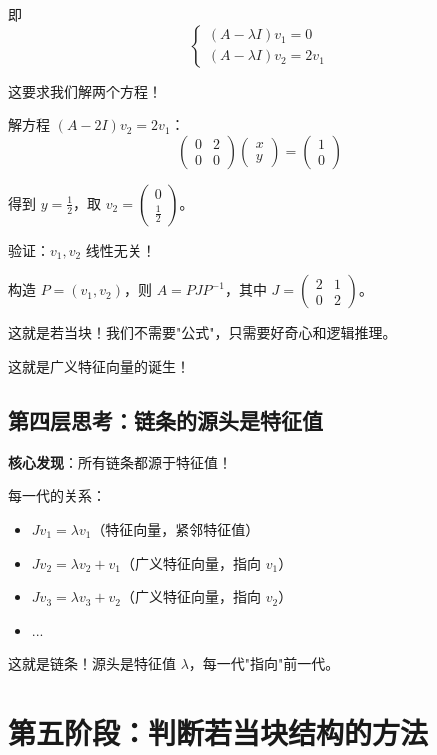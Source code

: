 \documentclass[12pt,a4paper]{article}
\begin{document}
即
\[
\begin{cases}
(A - \lambda I) v_1 = 0 \\
(A - \lambda I) v_2 =  2v_1
\end{cases}
\]

这要求我们解两个方程！


解方程 $(A - 2I)v_2 = 2v_1$：
\[
\begin{pmatrix} 0 & 2 \\ 0 & 0 \end{pmatrix} \begin{pmatrix} x \\ y \end{pmatrix} = \begin{pmatrix} 1 \\ 0 \end{pmatrix}
\]

得到 $y = \frac{1}{2}$，取 $v_2 = \begin{pmatrix} 0 \\ \frac{1}{2} \end{pmatrix}$。

验证：$v_1, v_2$ 线性无关！

构造 $P = (v_1, v_2)$，则 $A = PJP^{-1}$，其中 $J = \begin{pmatrix} 2 & 1 \\ 0 & 2 \end{pmatrix}$。

这就是若当块！我们不需要"公式"，只需要好奇心和逻辑推理。

这就是广义特征向量的诞生！

\subsection{第四层思考：链条的源头是特征值}

\textbf{核心发现}：所有链条都源于特征值！

每一代的关系：
\begin{itemize}
    \item $J v_1 = \lambda v_1$（特征向量，紧邻特征值）
    \item $J v_2 = \lambda v_2 + v_1$（广义特征向量，指向 $v_1$）
    \item $J v_3 = \lambda v_3 + v_2$（广义特征向量，指向 $v_2$）
    \item ...
\end{itemize}

这就是链条！源头是特征值 $\lambda$，每一代"指向"前一代。

\section{第五阶段：判断若当块结构的方法}
\end{document}
